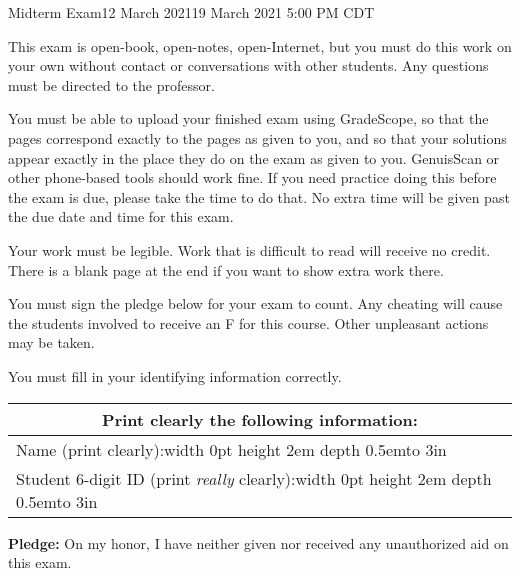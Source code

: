 \documentclass[12pt]{article}
\def\Tall{\vrule width 0pt height 2em depth 0.5em}
\begin{document}
\begin{assignment}{Midterm Exam}{12 March 2021}{19 March 2021 5:00 PM CDT}

{\small {\large {}}
This exam is open-book, open-notes, open-Internet, but you must do this
work on your own without contact or conversations with other students.
Any questions must be directed to the professor.

You must be able to upload your finished exam using GradeScope, so that the
pages correspond exactly to the pages as given to you, and so that your
solutions appear exactly in the place they do on the exam as given to you.
GenuisScan or other phone-based tools should work fine.  If you need practice
doing this before the exam is due, please take the time to do that.  No extra
time will be given past the due date and time for this exam.

Your work must be legible.  Work that is
difficult to read will receive no credit.  There is a blank page at the end
if you want to show extra work there.

You must sign the pledge below for your exam to count.  Any cheating will
cause the students involved to receive an F for this course. Other unpleasant
actions
may be taken.

You must fill in your identifying information correctly.  
}

\begin{center}\large
\begin{tabular}{|c|c|c|} \hline
\multicolumn{3}{|c|}{{\bf Print  clearly} the following information:}  \\ \hline
\multicolumn{3}{|l|}{Name (print clearly):\Tall{}\hbox to 3in{\hss}}  \\ \hline
\multicolumn{3}{|l|}{Student 6-digit ID (print {\it really} clearly):\Tall{}\hbox to 3in{\hss}} \\ \hline
\end{tabular}
\end{center}

{\bf Pledge:} On my honor, I have neither
given nor received any unauthorized aid on this exam.


\end{assignment}
\end{document}
